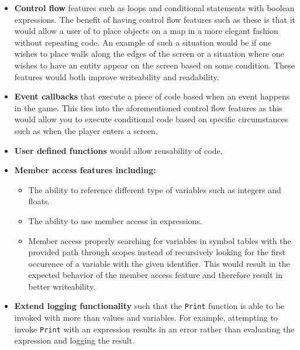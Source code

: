 \begin{itemize}
    \item
      \textbf{Control flow} features such as loops and conditional statements with boolean expressions. The benefit of having control flow features such as these is that it would allow a user of \dazel{} to place objects on a map in a more elegant fashion without repeating code. An example of such a situation would be if one wishes to place walls along the edges of the screen or a situation where one wishes to have an entity appear on the screen based on some condition. These features would both improve writeability and readability.
    \item
      \textbf{Event callbacks} that execute a piece of code based when an event happens in the game. This ties into the aforementioned control flow features as this would allow you to execute conditional code based on specific circumstances such as when the player enters a screen. 
    \item
      \textbf{User defined functions} would allow reusability of code. 
    \item
      \textbf{Member access features including:}
      \begin{itemize}
        \item
            The ability to reference different type of variables such as integers and floats.
        \item
            The ability to use member access in expressions.    
        \item
            Member access properly searching for variables in symbol tables with the provided path through scopes instead of recursively looking for the first occurence of a variable with the given identifier. This would result in the expected behavior of the member access feature and therefore result in better writeability.
      \end{itemize}
    \item
      \textbf{Extend logging functionality} such that the \texttt{Print} function is able to be invoked with more than values and variables. For example, attempting to invoke \texttt{Print} with an expression results in an error rather than evaluating the expression and logging the result.
\end{itemize}


